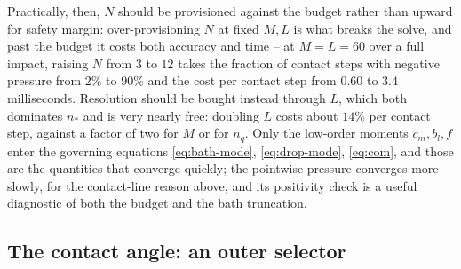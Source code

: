 Practically, then, $N$ should be provisioned against the budget rather than upward for safety margin: over-provisioning $N$ at fixed $M,L$ is what breaks the solve, and past the budget it costs both accuracy and time -- at $M=L=60$ over a full impact, raising $N$ from $3$ to $12$ takes the fraction of contact steps with negative pressure from $2\%$ to $90\%$ and the cost per contact step from $0.60$ to $3.4$ milliseconds. Resolution should be bought instead through $L$, which both dominates $n_\ast$ and is very nearly free: doubling $L$ costs about $14\%$ per contact step, against a factor of two for $M$ or for $n_q$. Only the low-order moments $c_m,b_l,f$ enter the governing equations \eqref{eq:bath-mode}, \eqref{eq:drop-mode}, \eqref{eq:com}, and those are the quantities that converge quickly; the pointwise pressure converges more slowly, for the contact-line reason above, and its positivity check is a useful diagnostic of both the budget and the bath truncation.

\subsection{The contact angle: an outer selector}
\label{subsec:contact-angle}

